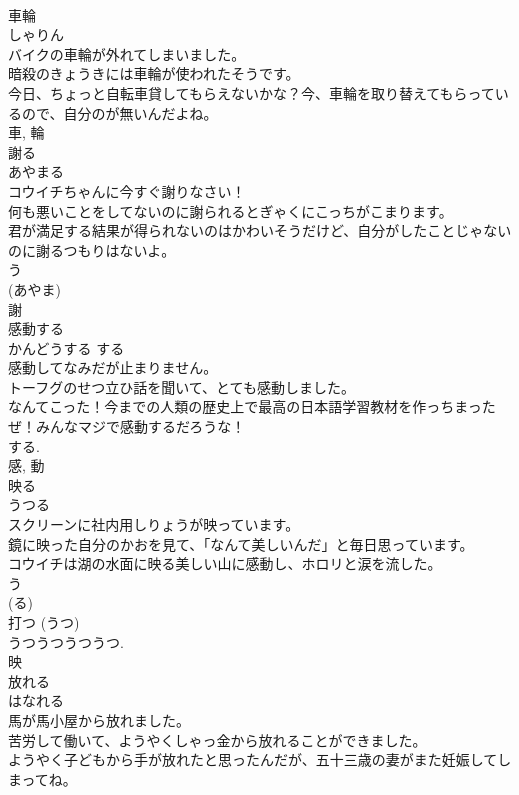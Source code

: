 \documentclass[8pt]{extreport}
\begin{document}
\begin{CJK}{UTF8}{min}
\\	車輪	
\\	しゃりん	
\\	バイクの車輪が外れてしまいました。	
\\	暗殺のきょうきには車輪が使われたそうです。	
\\	今日、ちょっと自転車貸してもらえないかな？今、車輪を取り替えてもらっているので、自分のが無いんだよね。	
\\	車, 輪	
\\	謝る	
\\	あやまる	
\\	コウイチちゃんに今すぐ謝りなさい！	
\\	何も悪いことをしてないのに謝られるとぎゃくにこっちがこまります。	
\\	君が満足する結果が得られないのはかわいそうだけど、自分がしたことじゃないのに謝るつもりはないよ。	
\\	う 
\\	(あやま) 
\\	謝	
\\	感動する	
\\	かんどうする	する 
\\	感動してなみだが止まりません。	
\\	トーフグのせつ立ひ話を聞いて、とても感動しました。	
\\	なんてこった！今までの人類の歴史上で最高の日本語学習教材を作っちまったぜ！みんなマジで感動するだろうな！	
\\	する. 
\\	感, 動	
\\	映る	
\\	うつる	
\\	スクリーンに社内用しりょうが映っています。	
\\	鏡に映った自分のかおを見て、「なんて美しいんだ」と毎日思っています。	
\\	コウイチは湖の水面に映る美しい山に感動し、ホロリと涙を流した。	
\\	う 
\\	(る) 
\\	打つ (うつ) 
\\	うつうつうつうつ. 
\\	映	
\\	放れる	
\\	はなれる	
\\	馬が馬小屋から放れました。	
\\	苦労して働いて、ようやくしゃっ金から放れることができました。	
\\	ようやく子どもから手が放れたと思ったんだが、五十三歳の妻がまた妊娠してしまってね。	

\end{CJK}
\end{document}

